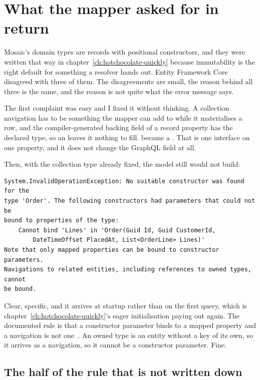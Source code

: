 \section{What the mapper asked for in return}
\label{sec:ch04-what-the-mapper-asked-for}

Mosaic's domain types are records with positional constructors, and they were
written that way in chapter~\ref{ch:hotchocolate-quickly} because immutability is
the right default for something a resolver hands out. Entity Framework Core
disagreed with three of them. The disagreements are small, the reason behind all
three is the same, and the reason is not quite what the error message says.

%
The first complaint was easy and I fixed it without thinking. A collection
navigation has to be something the mapper can add to while it materialises a
row, and the compiler-generated backing field of a record property has the
declared type, so an  leaves it nothing to fill.
 became a . That is one interface on one
property, and it does not change the GraphQL field at all.

Then, with the collection type already fixed, the model still would not build:

\begin{verbatim}
System.InvalidOperationException: No suitable constructor was found for the
type 'Order'. The following constructors had parameters that could not be
bound to properties of the type:
    Cannot bind 'Lines' in 'Order(Guid Id, Guid CustomerId,
        DateTimeOffset PlacedAt, List<OrderLine> Lines)'
Note that only mapped properties can be bound to constructor parameters.
Navigations to related entities, including references to owned types, cannot
be bound.
\end{verbatim}

%
Clear, specific, and it arrives at startup rather than on the first query, which
is chapter~\ref{ch:hotchocolate-quickly}'s eager initialisation paying out
again. The documented rule is that a constructor parameter binds to a mapped
property and a navigation is not one~\autocite{microsoft2026efconstructors}. An
owned type is an entity without a key of its own, so it arrives as a navigation,
so it cannot be a constructor parameter. Fine.

\subsection*{The half of the rule that is not written down}

